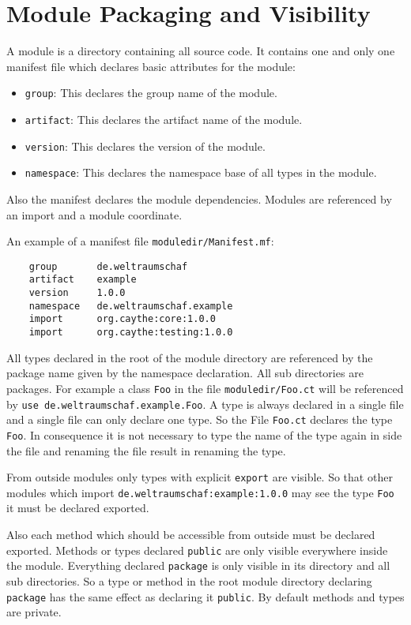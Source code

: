 \documentclass[a4paper,12pt]{report}
\begin{document}
\section{Module Packaging and Visibility}

A module is a directory containing all source code. It contains one and only one manifest file which declares basic attributes for the module:

\begin{itemize}
    \item \verb|group|: This declares the group name of the module.
    \item \verb|artifact|: This declares the artifact name of the module.
    \item \verb|version|: This declares the version of the module.
    \item \verb|namespace|: This declares the namespace base of all types in the module.
\end{itemize}

Also the manifest declares the module dependencies. Modules are referenced by an import and a module coordinate.

An example of a manifest file \verb|moduledir/Manifest.mf|:
\begin{verbatim}
    group       de.weltraumschaf
    artifact    example
    version     1.0.0
    namespace   de.weltraumschaf.example
    import      org.caythe:core:1.0.0
    import      org.caythe:testing:1.0.0
\end{verbatim}

All types declared in the root of the module directory are referenced by the package name given by the namespace declaration. All sub directories are packages. For example a class \verb|Foo| in the file \verb|moduledir/Foo.ct| will be referenced by \verb|use de.weltraumschaf.example.Foo|. A type is always declared in a single file and a single file can only declare one type. So the File \verb|Foo.ct| declares the type \verb|Foo|. In consequence it is not necessary to type the name of the type again in side the file and renaming the file result in renaming the type.

From outside modules only types with explicit \verb|export| are visible. So that other modules which import \verb|de.weltraumschaf:example:1.0.0| may see the type \verb|Foo| it must be declared exported.

Also each method which should be accessible from outside must be declared exported. Methods or types declared \verb|public| are only visible everywhere inside the module. Everything declared \verb|package| is only visible in its directory and all sub directories. So a type or method in the root module directory declaring \verb|package| has the same effect as declaring it \verb|public|. By default methods and types are private.
\end{document}
